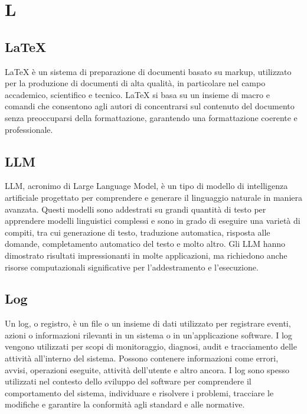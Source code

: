 \section{L}

\vspace{2em}
\subsection*{LaTeX}
LaTeX è un sistema di preparazione di documenti basato su markup, utilizzato per la produzione di documenti di alta qualità, in particolare nel campo accademico, scientifico e tecnico. LaTeX si basa su un insieme di macro e comandi che consentono agli autori di concentrarsi sul contenuto del documento senza preoccuparsi della formattazione, garantendo una formattazione coerente e professionale.

\vspace{2em}
\subsection*{LLM}
LLM, acronimo di Large Language Model, è un tipo di modello di intelligenza artificiale progettato per comprendere e generare il linguaggio naturale in maniera avanzata. Questi modelli sono addestrati su grandi quantità di testo per apprendere modelli linguistici complessi e sono in grado di eseguire una varietà di compiti, tra cui generazione di testo, traduzione automatica, risposta alle domande, completamento automatico del testo e molto altro. Gli LLM hanno dimostrato risultati impressionanti in molte applicazioni, ma richiedono anche risorse computazionali significative per l'addestramento e l'esecuzione.

\vspace{2em}
\subsection*{Log}
Un log, o registro, è un file o un insieme di dati utilizzato per registrare eventi, azioni o informazioni rilevanti in un sistema o in un'applicazione software. I log vengono utilizzati per scopi di monitoraggio, diagnosi, audit e tracciamento delle attività all'interno del sistema. Possono contenere informazioni come errori, avvisi, operazioni eseguite, attività dell'utente e altro ancora. I log sono spesso utilizzati nel contesto dello sviluppo del software per comprendere il comportamento del sistema, individuare e risolvere i problemi, tracciare le modifiche e garantire la conformità agli standard e alle normative.
